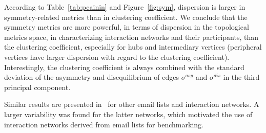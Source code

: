 																							According to Table~\ref{tab:pcainin} and Figure~\ref{fig:sym},
																							dispersion is larger in symmetry-related metrics than in clustering coefficient.
																							We conclude that the symmetry metrics are more powerful, in terms of dispersion in the topological metrics space, in characterizing interaction networks and their participants, than the clustering coefficient, especially for hubs and intermediary vertices (peripheral vertices have larger dispersion with regard to the clustering coefficient).
																							Interestingly, the clustering coefficient is always combined
																							with the standard deviation of the asymmetry and disequilibrium
																							of edges $\sigma^{asy}$ and $\sigma^{dis}$ in the third principal component.

																							Similar results are presented in~\cite{stab} for other email lists and interaction networks. A larger variability was found for the latter networks,
																							which motivated the use of interaction networks derived from email lists for benchmarking.


